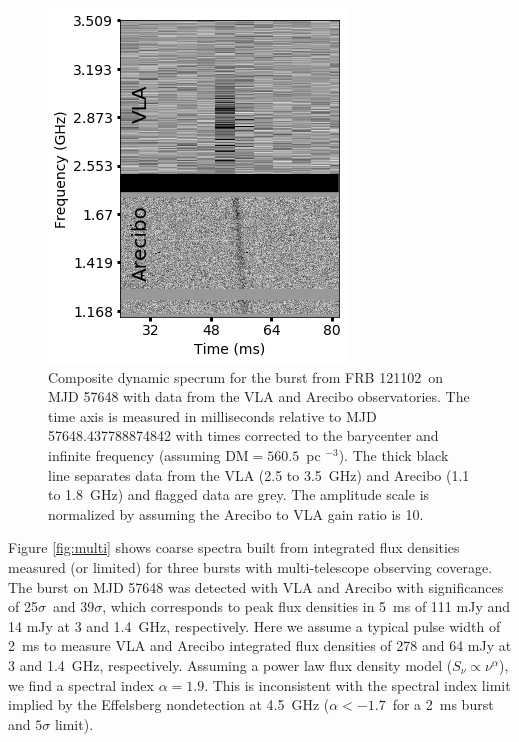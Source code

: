 \documentclass[twocolumn]{aastex61}
\newcommand{\frb}{FRB 121102}
\begin{document}
\begin{figure}[htb]
\begin{center}
 \includegraphics[width=\columnwidth]{aovla_spec.png}
 \caption{Composite dynamic specrum for the burst from \frb\ on MJD 57648 with data from the VLA and Arecibo observatories. The time axis is measured in milliseconds relative to MJD 57648.437788874842 with times corrected to the barycenter and infinite frequency (assuming DM$=560.5$\ pc $^{-3}$). The thick black line separates data from the VLA (2.5 to 3.5~GHz) and Arecibo (1.1 to 1.8~GHz) and flagged data are grey. The amplitude scale is normalized by assuming the Arecibo to VLA gain ratio is 10.
 \label{fig:sgram}}
\end{center}
\end{figure}


Figure \ref{fig:multi} shows coarse spectra built from integrated flux densities measured (or limited) for three bursts with multi-telescope observing coverage. The burst on MJD 57648 was detected with VLA and Arecibo with significances of 25$\sigma$\ and 39$\sigma$, which corresponds to peak flux densities in 5~ms of 111 mJy and 14 mJy at 3 and 1.4~GHz, respectively. Here we assume a typical pulse width of 2~ms to measure VLA and Arecibo integrated flux densities of 278 and 64 mJy at 3 and 1.4~GHz, respectively. Assuming a power law flux density model ($S_{\nu} \propto \nu^{\alpha}$), we find a spectral index $\alpha=1.9$. This is inconsistent with the spectral index limit implied by the Effelsberg nondetection at 4.5~GHz ($\alpha<-1.7$\ for a 2~ms burst and $5\sigma$ limit).
\end{document}
